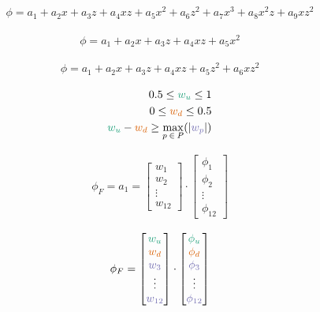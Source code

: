 \documentclass{article}
\begin{document}
\begin{align*}
\phi = a_1 + a_2 x + a_3 z + a_4 x z + a_5 x^2 + a_6 z^2 + a_7 x^3 + a_8 x^2 z + a_9 x z^2
\end{align*}

\begin{align*}
\phi = a_1 + a_2 x + a_3 z + a_4 x z + a_5 x^2
\end{align*}

\begin{align*}
\phi = a_1 + a_2 x + a_3 z + a_4 x z + a_5 z^2 + a_6 x z^2
\end{align*}

\begin{align*}
	0.5 \leq \textcolor{u}{w_u} \leq 1 \\
	0 \leq \textcolor{d}{w_d} \leq 0.5 \\
	\textcolor{u}{w_u} - \textcolor{d}{w_d} \geq \max_{p\:\in\:P}(|\textcolor{p}{w_p}|)
\end{align*}

\begin{align*}
	\phi_F = a_1 = \begin{bmatrix}
		w_1 \\
		w_2 \\
		\vdots \\
		w_{12}
	\end{bmatrix}
	\cdot
	\begin{bmatrix}
		\phi_1 \\
		\phi_2 \\
		\vdots \\
		\phi_{12}
	\end{bmatrix}
\end{align*}

\begin{align*}
	\phi_F = \begin{bmatrix}
		\textcolor{u}{w_u} \\
		\textcolor{d}{w_d} \\
		\textcolor{p}{w_3} \\
		\vdots \\
		\textcolor{p}{w_{12}}
	\end{bmatrix}
	\cdot
	\begin{bmatrix}
		\textcolor{u}{\phi_u} \\
		\textcolor{d}{\phi_d} \\
		\textcolor{p}{\phi_3} \\
		\vdots \\
		\textcolor{p}{\phi_{12}}
	\end{bmatrix}
\end{align*}
\end{document}
